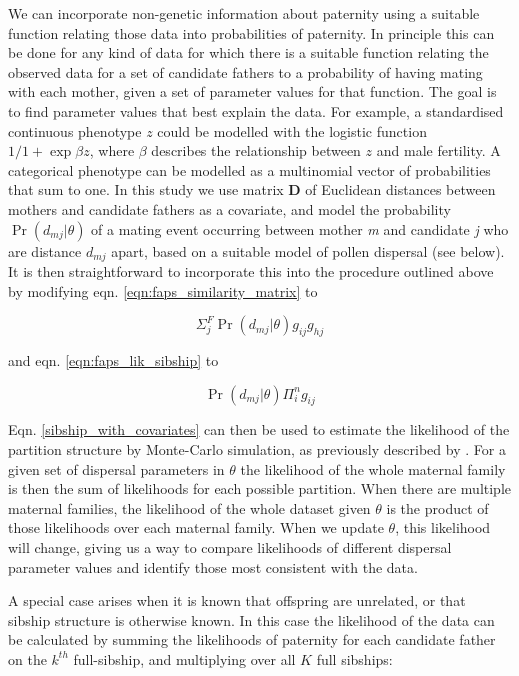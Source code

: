 \documentclass[10pt, a4paper, twocolumn]{article} %
\begin{document}
We can incorporate non-genetic information about paternity using a suitable function relating those data into probabilities of paternity.
In principle this can be done for any kind of data for which there is a suitable function relating the observed data for a set of candidate fathers to a probability of having mating with each mother, given a set of parameter values for that function. The goal is to find parameter values that best explain the data. For example, a standardised continuous phenotype $z$ could be modelled with the logistic function $1/1+\exp{\beta z}$, where $\beta$ describes the relationship between $z$ and male fertility. A categorical phenotype can be modelled as a multinomial vector of probabilities that sum to one. In this study we use matrix \textbf{D} of Euclidean distances between mothers and candidate fathers as a covariate, and model the probability $\Pr(d_{mj}|\theta)$ of a mating event occurring between mother \textit{m} and candidate \textit{j} who are distance $d_{mj}$ apart, based on a suitable model of pollen dispersal (see below). It is then straightforward to incorporate this into the procedure outlined above by modifying eqn. \ref{eqn:faps_similarity_matrix} to

\begin{equation}\label{eqn:pairwise_with_covariates}
\Sigma_j^F \Pr(d_{mj} | \theta)g_{ij}g_{hj}
\end{equation}

and eqn. \ref{eqn:faps_lik_sibship} to

\begin{equation}
\label{sibship_with_covariates}
\Pr(d_{mj} | \theta)\Pi_i^n g_{ij}
\end{equation}

Eqn. \ref{sibship_with_covariates} can then be used to estimate the likelihood of the partition structure by Monte-Carlo simulation, as previously described by \cite{ellis2018efficient}.
For a given set of dispersal parameters in $\theta$ the likelihood of the whole maternal family is then the sum of likelihoods for each possible partition. When there are multiple maternal families, the likelihood of the whole dataset given $\theta$ is the product of those likelihoods over each maternal family. When we update $\theta$, this likelihood will change, giving us a way to compare likelihoods of different dispersal parameter values and identify those most consistent with the data.

A special case arises when it is known that offspring are unrelated, or that sibship structure is otherwise known. In this case the likelihood of the data can be calculated by summing the likelihoods of paternity for each candidate father on the $k^{th}$ full-sibship, and multiplying over all $K$ full sibships:
\end{document}
